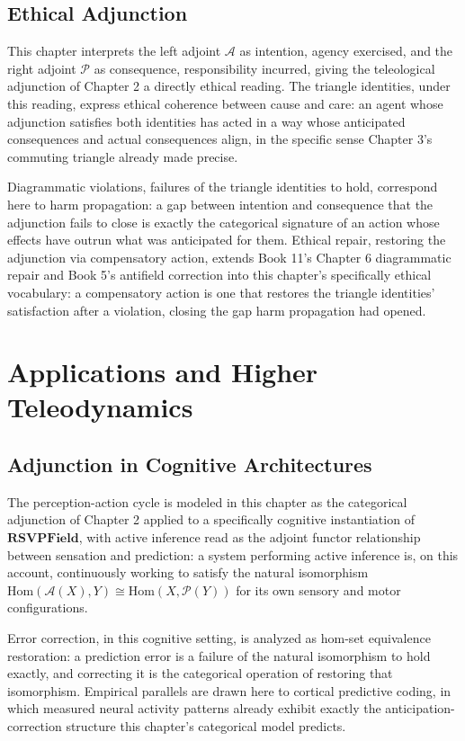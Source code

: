 \chapter{Ethical Adjunction}

This chapter interprets the left adjoint $\mathcal{A}$ as intention, agency exercised, and the right adjoint $\mathcal{P}$ as consequence, responsibility incurred, giving the teleological adjunction of Chapter 2 a directly ethical reading. The triangle identities, under this reading, express ethical coherence between cause and care: an agent whose adjunction satisfies both identities has acted in a way whose anticipated consequences and actual consequences align, in the specific sense Chapter 3's commuting triangle already made precise.

Diagrammatic violations, failures of the triangle identities to hold, correspond here to harm propagation: a gap between intention and consequence that the adjunction fails to close is exactly the categorical signature of an action whose effects have outrun what was anticipated for them. Ethical repair, restoring the adjunction via compensatory action, extends Book 11's Chapter 6 diagrammatic repair and Book 5's antifield correction into this chapter's specifically ethical vocabulary: a compensatory action is one that restores the triangle identities' satisfaction after a violation, closing the gap harm propagation had opened.

\part{Applications and Higher Teleodynamics}

\chapter{Adjunction in Cognitive Architectures}

The perception-action cycle is modeled in this chapter as the categorical adjunction of Chapter 2 applied to a specifically cognitive instantiation of $\mathbf{RSVPField}$, with active inference read as the adjoint functor relationship between sensation and prediction: a system performing active inference is, on this account, continuously working to satisfy the natural isomorphism $\mathrm{Hom}(\mathcal{A}(X), Y) \cong \mathrm{Hom}(X, \mathcal{P}(Y))$ for its own sensory and motor configurations.

Error correction, in this cognitive setting, is analyzed as hom-set equivalence restoration: a prediction error is a failure of the natural isomorphism to hold exactly, and correcting it is the categorical operation of restoring that isomorphism. Empirical parallels are drawn here to cortical predictive coding, in which measured neural activity patterns already exhibit exactly the anticipation-correction structure this chapter's categorical model predicts.

